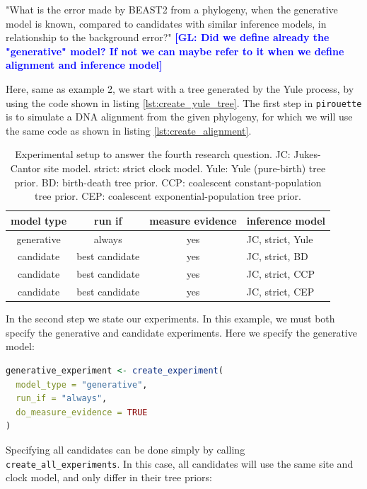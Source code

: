 \documentclass{article}
\newcommand{\giovanni}[1]{\textcolor{blue}{\textbf{[GL: #1]}}}
\begin{document}
"What is the error made by BEAST2 from a phylogeny, when the generative model is known, compared to candidates with similar inference models, in relationship to the background error?"
\giovanni{Did we define already the "generative" model? If not we can maybe refer to it when we define alignment and inference model}

Here, same as example 2, we start with a tree generated by the Yule process, by using the code shown in listing \ref{lst:create_yule_tree}.
The first step in \verb;pirouette; is to simulate a DNA alignment 
from the given phylogeny, for which we will use the same code 
as shown in listing \ref{lst:create_alignment}.

\begin{table}
  \begin{tabular}{ | c | c | c | l | }
    \hline
    \textbf{model type} & \textbf{run if} & \textbf{measure evidence} & \textbf{inference model} \\ 
    \hline
    generative & always         & yes & JC, strict, Yule \\
    candidate  & best candidate & yes & JC, strict, BD \\
    candidate  & best candidate & yes & JC, strict, CCP \\
    candidate  & best candidate & yes & JC, strict, CEP \\
    \hline
  \end{tabular}
  \caption{
    Experimental setup to answer the fourth research question.
    JC: Jukes-Cantor site model.
    strict: strict clock model.
    Yule: Yule (pure-birth) tree prior.
    BD: birth-death tree prior.
    CCP: coalescent constant-population tree prior.
    CEP: coalescent exponential-population tree prior.
  }
  \label{tab:experiment_4}
\end{table}

In the second step we state our experiments. 
In this example, we must both specify the generative and candidate experiments. Here we specify the generative model:

\begin{lstlisting}[language=R, floatplacement=H, frame=single]
generative_experiment <- create_experiment(
  model_type = "generative",
  run_if = "always",
  do_measure_evidence = TRUE
)
\end{lstlisting}

Specifying all candidates can be done simply by calling \verb;create_all_experiments;. In this case, all candidates will use the same site and clock model, and only differ in their tree priors:
\end{document}
